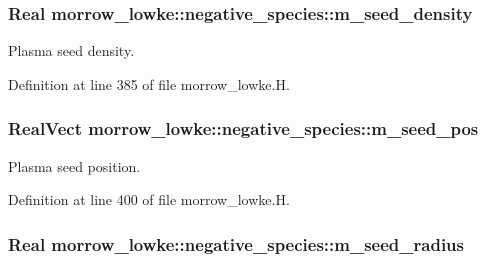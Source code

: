 \subsubsection[{\texorpdfstring{m\+\_\+seed\+\_\+density}{m_seed_density}}]{\setlength{\rightskip}{0pt plus 5cm}Real morrow\+\_\+lowke\+::negative\+\_\+species\+::m\+\_\+seed\+\_\+density}\hypertarget{classmorrow__lowke_1_1negative__species_af9d7c780db788e079ada07ff5e708533}{}\label{classmorrow__lowke_1_1negative__species_af9d7c780db788e079ada07ff5e708533}


Plasma seed density. 



Definition at line 385 of file morrow\+\_\+lowke.\+H.

\subsubsection[{\texorpdfstring{m\+\_\+seed\+\_\+pos}{m_seed_pos}}]{\setlength{\rightskip}{0pt plus 5cm}Real\+Vect morrow\+\_\+lowke\+::negative\+\_\+species\+::m\+\_\+seed\+\_\+pos}\hypertarget{classmorrow__lowke_1_1negative__species_a35e0a4949be3fffbbb812922b633333c}{}\label{classmorrow__lowke_1_1negative__species_a35e0a4949be3fffbbb812922b633333c}


Plasma seed position. 



Definition at line 400 of file morrow\+\_\+lowke.\+H.

\subsubsection[{\texorpdfstring{m\+\_\+seed\+\_\+radius}{m_seed_radius}}]{\setlength{\rightskip}{0pt plus 5cm}Real morrow\+\_\+lowke\+::negative\+\_\+species\+::m\+\_\+seed\+\_\+radius}\hypertarget{classmorrow__lowke_1_1negative__species_a3f8dbf15219e890451add010c482a9d9}{}\label{classmorrow__lowke_1_1negative__species_a3f8dbf15219e890451add010c482a9d9}


